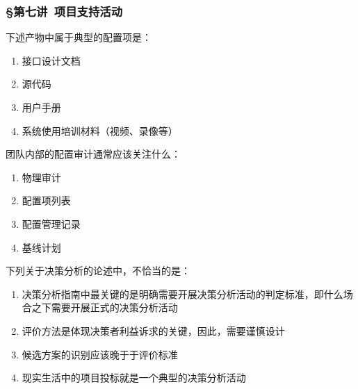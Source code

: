 \subsubsection*{\S 第七讲\ 项目支持活动}
\setcounter{problemname}{0}

\begin{problem}
	下述产物中属于典型的配置项是：
    \vspace{-0.8em}
    \begin{multicols}{2}
        \begin{enumerate}[label=\Alph*.]
            \item 接口设计文档
            \item 源代码
            \item 用户手册
            \item 系统使用培训材料（视频、录像等）
        \end{enumerate}
    \end{multicols}
    \vspace{-1em}
\end{problem}



\begin{problem}
	团队内部的配置审计通常应该关注什么：
    \vspace{-0.8em}
    \begin{multicols}{4}
        \begin{enumerate}[label=\Alph*.]
            \item 物理审计
            \item 配置项列表
            \item 配置管理记录
            \item 基线计划
        \end{enumerate}
    \end{multicols}
    \vspace{-1em}
\end{problem}



\begin{problem}
	下列关于决策分析的论述中，不恰当的是：
        \begin{enumerate}[label=\Alph*.]
            \item 决策分析指南中最关键的是明确需要开展决策分析活动的判定标准，即什么场合之下需要开展正式的决策分析活动
            \item 评价方法是体现决策者利益诉求的关键，因此，需要谨慎设计
            \item 候选方案的识别应该晚于于评价标准
            \item 现实生活中的项目投标就是一个典型的决策分析活动
        \end{enumerate}
\end{problem}




